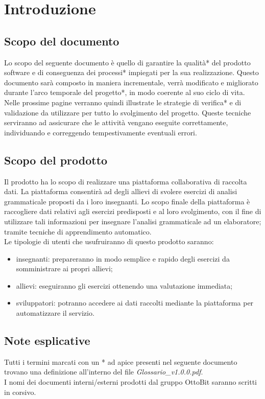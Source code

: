 \section{Introduzione}
\subsection{Scopo del documento}
Lo scopo del seguente documento è quello di garantire la qualità* del prodotto software e di conseguenza dei processi* impiegati per la sua realizzazione. Questo documento sarà composto in maniera incrementale, verrà modificato e migliorato durante l'arco temporale del progetto*, in modo coerente al suo ciclo di vita. Nelle prossime pagine verranno quindi illustrate le strategie di verifica* e di validazione da utilizzare per tutto lo svolgimento del progetto. Queste tecniche serviranno ad assicurare che le attività vengano eseguite correttamente, individuando e correggendo tempestivamente eventuali errori.
\subsection{Scopo del prodotto}
Il prodotto ha lo scopo di realizzare una piattaforma collaborativa di raccolta dati.  La piattaforma consentirà ad degli allievi di svolere esercizi di analisi grammaticale proposti da i loro insegnanti.
Lo scopo finale della piattaforma è raccogliere dati relativi agli esercizi predisposti e al loro svolgimento, con il fine di utilizzare tali informazioni per insegnare l'analisi grammaticale ad un elaboratore; tramite tecniche di apprendimento automatico.\\
Le tipologie di utenti che usufruiranno di questo prodotto saranno:
\begin{itemize}
	\item insegnanti: prepareranno in modo semplice e rapido degli esercizi da somministrare ai propri allievi;
	\item allievi: eseguiranno gli esercizi ottenendo una valutazione immediata;
	\item sviluppatori: potranno accedere ai dati raccolti mediante la piattaforma per automatizzare il servizio.
\end{itemize}
\subsection{Note esplicative}
Tutti i termini marcati con un * ad apice presenti nel seguente documento trovano una definizione all'interno del file \textit{Glossario\_v1.0.0.pdf}.\\
I nomi dei documenti interni/esterni prodotti dal gruppo OttoBit saranno scritti in corsivo.
